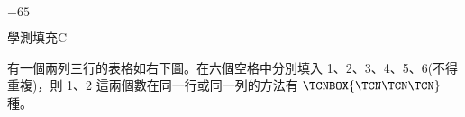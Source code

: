 \begin{QUESTIONS}
\begin{QUESTION}
\begin{QANS}
            $-65$
        \end{QANS}
        \begin{QSOLLIST}
        \end{QSOLLIST}
        \begin{QEMPTYSPACE}
        \end{QEMPTYSPACE}
    \end{QUESTION}
    \begin{QUESTION}
        \begin{ExamInfo}{99}{學測}{填充}{C}
        \end{ExamInfo}
        \begin{ExamAnsRateInfo}{26}{53}{22}{3}
        \end{ExamAnsRateInfo}
        \begin{QBODY}
            有一個兩列三行的表格如右下圖。在六個空格中分別填入 1、2、3、4、5、6(不得重複)，則 1、2 這兩個數在同一行或同一列的方法有 $\TCNBOX{\TCN\TCN\TCN}$ 種。


\end{QBODY}
\end{QUESTION}
\end{QUESTIONS}
